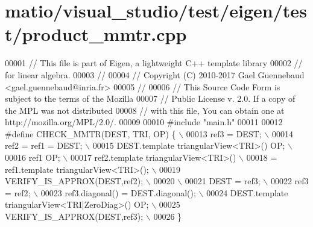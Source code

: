 \hypertarget{matio_2visual__studio_2test_2eigen_2test_2product__mmtr_8cpp_source}{}\section{matio/visual\+\_\+studio/test/eigen/test/product\+\_\+mmtr.cpp}
\label{matio_2visual__studio_2test_2eigen_2test_2product__mmtr_8cpp_source}

\begin{DoxyCode}
00001 \textcolor{comment}{// This file is part of Eigen, a lightweight C++ template library}
00002 \textcolor{comment}{// for linear algebra.}
00003 \textcolor{comment}{//}
00004 \textcolor{comment}{// Copyright (C) 2010-2017 Gael Guennebaud <gael.guennebaud@inria.fr>}
00005 \textcolor{comment}{//}
00006 \textcolor{comment}{// This Source Code Form is subject to the terms of the Mozilla}
00007 \textcolor{comment}{// Public License v. 2.0. If a copy of the MPL was not distributed}
00008 \textcolor{comment}{// with this file, You can obtain one at http://mozilla.org/MPL/2.0/.}
00009 
00010 \textcolor{preprocessor}{#include "main.h"}
00011 
00012 \textcolor{preprocessor}{#define CHECK\_MMTR(DEST, TRI, OP) \{                   \(\backslash\)}
00013 \textcolor{preprocessor}{    ref3 = DEST;                                      \(\backslash\)}
00014 \textcolor{preprocessor}{    ref2 = ref1 = DEST;                               \(\backslash\)}
00015 \textcolor{preprocessor}{    DEST.template triangularView<TRI>() OP;           \(\backslash\)}
00016 \textcolor{preprocessor}{    ref1 OP;                                          \(\backslash\)}
00017 \textcolor{preprocessor}{    ref2.template triangularView<TRI>()               \(\backslash\)}
00018 \textcolor{preprocessor}{      = ref1.template triangularView<TRI>();          \(\backslash\)}
00019 \textcolor{preprocessor}{    VERIFY\_IS\_APPROX(DEST,ref2);                      \(\backslash\)}
00020 \textcolor{preprocessor}{    \(\backslash\)}
00021 \textcolor{preprocessor}{    DEST = ref3;                                      \(\backslash\)}
00022 \textcolor{preprocessor}{    ref3 = ref2;                                      \(\backslash\)}
00023 \textcolor{preprocessor}{    ref3.diagonal() = DEST.diagonal();                \(\backslash\)}
00024 \textcolor{preprocessor}{    DEST.template triangularView<TRI|ZeroDiag>() OP;  \(\backslash\)}
00025 \textcolor{preprocessor}{    VERIFY\_IS\_APPROX(DEST,ref3);                      \(\backslash\)}
00026 \textcolor{preprocessor}{  \}}

\end{DoxyCode}
